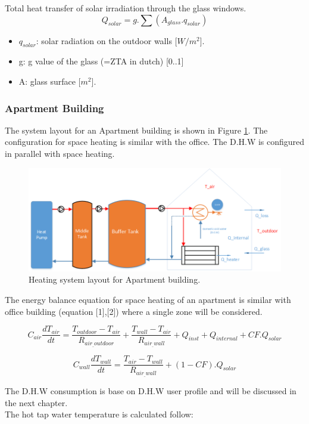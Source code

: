 Total heat transfer of solar irradiation through the glass windows. 
\begin{equation}
Q_{solar}=g.\sum(A_{glass}.q_{solar})
\end{equation}

\begin{itemize}
    \item $q_{solar}$: solar radiation on the outdoor walls [$W/m^2$]. 
    \item g: g value of the glass (=ZTA in dutch) [0..1]
    \item A: glass surface [$m^2$].
\end{itemize}

\subsubsection{Apartment Building}

The system layout for an Apartment building is shown in Figure \ref{fig:ap_heatinglayout}. The configuration for space heating is similar with the office. The D.H.W is configured in parallel with space heating.

\begin{figure}[H]
\centering
\includegraphics[width=1\columnwidth]{pictures/Apartment_diagram.png}
\caption[Short title]{Heating system layout for Apartment building.}
\label{fig:ap_heatinglayout}\end{figure}


The energy balance equation for space heating of an apartment is similar with office building (equation [1],[2]) where a single zone will be considered.

\[C_{air}\frac{dT_{air}}{dt}=\frac{T_{outdoor}-T_{air}}{R_{air_{\_}outdoor}} + \frac{T_{wall}-T_{air}}{R_{air_{\_}wall}} + Q_{inst} + Q_{internal} + CF.Q_{solar}\]

\[C_{wall}\frac{dT_{wall}}{dt}=\frac{T_{air}-T_{wall}}{R_{air_{\_}wall}} + (1-CF).Q_{solar}\]

The D.H.W consumption is base on D.H.W user profile and will be discussed in the next chapter.\\
The hot tap water temperature is calculated follow:


